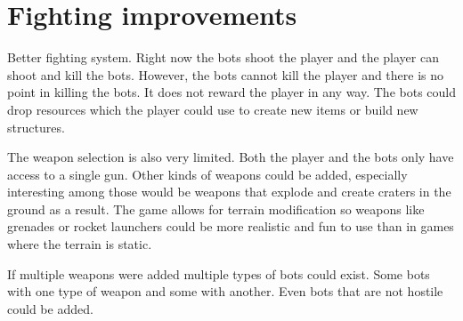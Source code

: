 \section{Fighting improvements}
Better fighting system. 
Right now the bots shoot the player and the player can shoot and kill the bots. 
However, the bots cannot kill the player and there is no point in killing the bots. 
It does not reward the player in any way.
The bots could drop resources which the player could use to create new items or build new structures.

The weapon selection is also very limited.
Both the player and the bots only have access to a single gun.
Other kinds of weapons could be added, especially interesting among those would be weapons that explode and create craters in the ground as a result.
The game allows for terrain modification so weapons like grenades or rocket launchers could be more realistic and fun to use than in games where the terrain is static.

If multiple weapons were added multiple types of bots could exist.
Some bots with one type of weapon and some with another.
Even bots that are not hostile could be added.
